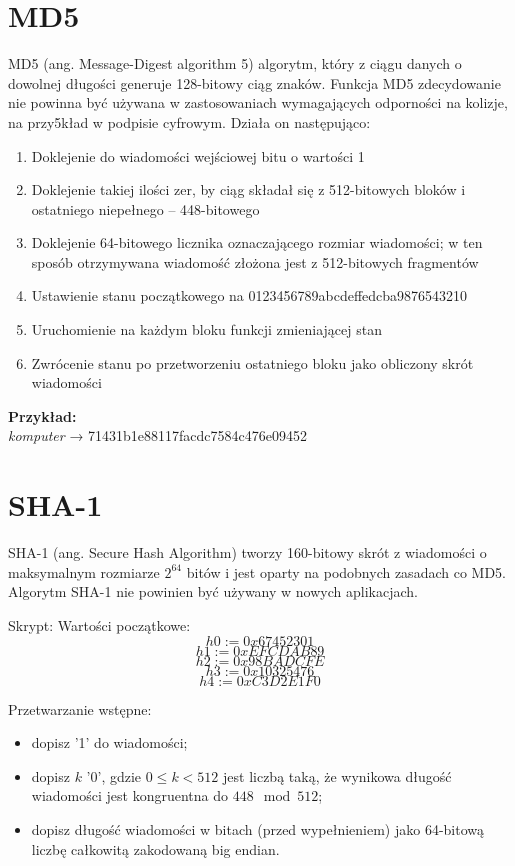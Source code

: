 \documentclass[12pt, letterpaper]{article}
\begin{document}
\section{MD5}
MD5 (ang. Message-Digest algorithm 5) algorytm, który z ciągu danych o dowolnej długości generuje 128-bitowy ciąg znaków.
Funkcja MD5 zdecydowanie nie powinna być używana w zastosowaniach wymagających odporności na kolizje, na przy5kład w podpisie cyfrowym.
Działa on następująco:
\begin{enumerate}
    \item Doklejenie do wiadomości wejściowej bitu o wartości 1
    \item Doklejenie takiej ilości zer, by ciąg składał się z 512-bitowych bloków i ostatniego niepełnego – 448-bitowego
    \item Doklejenie 64-bitowego licznika oznaczającego rozmiar wiadomości; w ten sposób otrzymywana wiadomość złożona jest z 512-bitowych fragmentów
    \item Ustawienie stanu początkowego na 0123456789abcdeffedcba9876543210
    \item Uruchomienie na każdym bloku funkcji zmieniającej stan
    \item Zwrócenie stanu po przetworzeniu ostatniego bloku jako obliczony skrót wiadomości
\end{enumerate}
\textbf{Przykład:}\\
\textit{komputer} → 71431b1e88117facdc7584c476e09452
\newpage
\section{SHA-1}
SHA-1 (ang. Secure Hash Algorithm) tworzy 160-bitowy skrót z wiadomości o maksymalnym rozmiarze \(2^{64}\) bitów i jest oparty na podobnych zasadach co MD5. Algorytm SHA-1 nie powinien być używany w nowych aplikacjach.

Skrypt:
Wartości początkowe:
\[ h0 := 0x67452301 \]
\[ h1 := 0xEFCDAB89 \]
\[ h2 := 0x98BADCFE \]
\[ h3 := 0x10325476 \]
\[ h4 := 0xC3D2E1F0 \]

Przetwarzanie wstępne:
\begin{itemize}
    \item dopisz '1' do wiadomości;
    \item dopisz \(k\) '0', gdzie \(0 \leq k < 512\) jest liczbą taką, że wynikowa długość wiadomości jest kongruentna do \(448 \mod 512\);
    \item dopisz długość wiadomości w bitach (przed wypełnieniem) jako 64-bitową liczbę całkowitą zakodowaną big endian.
\end{itemize}
\end{document}

